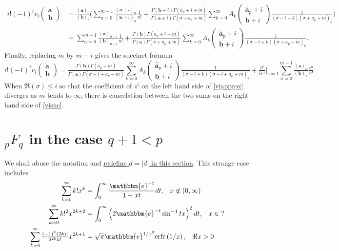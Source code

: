 \documentclass[12pt]{article}
\newcommand{\ee}[0] {\mathbbm{e}}
\numberwithin{equation}{section}
\newcommand{\Head}[3] {{}_{#1}{#2}_{#3}}
\newcommand{\ParamS}[2] {( \begin{smallmatrix} #1 \\ #2 \end{smallmatrix})}
\begin{document}
\begin{align*}
i! (-1)^i v_i \ParamS{\mathbf{a}}{\mathbf{b}} &= \tfrac{(\mathbf{a})_i}{(\mathbf{b})_i} \Big(  \sum_{n=0}^{m-1}{\tfrac{(\mathbf{a}+i)_n}{(\mathbf{b}+i)_n} \tfrac{1}{n!}} +\tfrac{\Gamma(\mathbf{b}+i) \Gamma(a_p+i+m)}{\Gamma(\mathbf{a}+i) \Gamma(\sigma+a_p+m)} \sum_{k=0}^{\infty} A_k \ParamS{\hat{\mathbf{a}}_p+i}{\mathbf{b}+i} \tfrac{1}{(\sigma-i+k) (\sigma+a_p+m)_k} \Big)\\
&=\sum_{n=0}^{m-1}{\tfrac{(\mathbf{a})_{n+i}}{(\mathbf{b})_{n+i}} \tfrac{1}{n!}} + \tfrac{\Gamma(\mathbf{b}) \Gamma(a_p+i+m)}{\Gamma(\mathbf{a}) \Gamma(\sigma+a_p+m)} \sum_{k=0}^{\infty} A_k \ParamS{\hat{\mathbf{a}}_p+i}{\mathbf{b}+i} \tfrac{1}{(\sigma-i+k) (\sigma+a_p+m)_k}\text{.}
\end{align*}
Finally, replacing $m$ by $m-i$ gives the succinct formula
\begin{equation}
\label{visuc}
i! (-1)^i v_i \ParamS{\mathbf{a}}{\mathbf{b}} = \tfrac{\Gamma(\mathbf{b}) \Gamma(a_p+m)}{\Gamma(\mathbf{a}) \Gamma(\sigma-i+a_p+m)} \sum_{k=0}^{\infty} A_k \ParamS{\hat{\mathbf{a}}_p+i}{\mathbf{b}+i} \tfrac{1}{(\sigma-i+k) (\sigma-i+a_p+m)_k} +\tfrac{\partial^i}{\partial z^i} \Big|_{z=1} \sum_{n=0}^{m-1}{\tfrac{(\mathbf{a})_{n}}{(\mathbf{b})_{n}} \tfrac{z^n}{n!}}\text{.}
\end{equation}
When $\Re(\sigma) \le i$ so that the coefficient of $z^i$ on the left hand side of \eqref{viapprox} diverges as $m$ tends to $\infty$, there is cancelation between the two sums on the right hand side of \eqref{visuc}.

\section{$\Head{p}{F}{q}$ in the case $q+1<p$}
\label{section_negd}
We shall abuse the notation and \underline{redefine $d=|d|$ in this section}. This strange case includes
\begin{align*}
\sum_{k=0}^{\infty} k! x^k &= \int_{0}^{\infty} \frac{\ee^{-t}}{1-x t} dt\text{,} \quad x \not \in (0,\infty)\\
\sum_{k=0}^{\infty} k!^2 x^{2k+2} &= \int_{0}^{\infty} \left(2 \ee^{-t} \sin ^{-1}tx\right)^2 dt\text{,} \quad x \in \ ?\\
\sum_{k=0}^{\infty}\tfrac{(-1)^k (2 k)!}{2^{2 k}k!} x^{2 k+1} &=\sqrt{\pi } \ee^{1/x^2}
   \text{erfc}\left(1/x\right)\text{,} \quad \Re x > 0
\end{align*}
\end{document}
